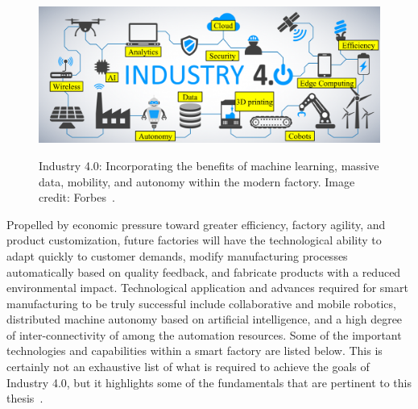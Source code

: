 \begin{figure}[!tbp]
	\begin{center}
		\includegraphics[width=\textwidth]{chapter-intro/images/intro/forbes-i40-candell.png}
		\label{fig:intro:forbes-i40}
		\caption{Industry 4.0: Incorporating the benefits of machine learning, massive data, mobility, and autonomy within the modern factory. Image credit: Forbes~\cite{Forbes-I40}.}
	\end{center}
\end{figure}

Propelled by economic pressure toward greater efficiency, factory agility, and product customization, future factories will have the technological ability to adapt quickly to customer demands, modify manufacturing processes automatically based on quality feedback, and fabricate products with a reduced environmental impact.  Technological application and advances required for smart manufacturing to be truly successful include collaborative and mobile robotics, distributed machine autonomy based on artificial intelligence, and a high degree of inter-connectivity of among the automation resources.  Some of the important technologies and capabilities within a smart factory are listed below.  This is certainly not an exhaustive list of what is required to achieve the goals of Industry 4.0, but it highlights some of the fundamentals that are pertinent to this thesis~\cite{Mueller2017, Zheng2018, Liu2019, Cheng2018}.

